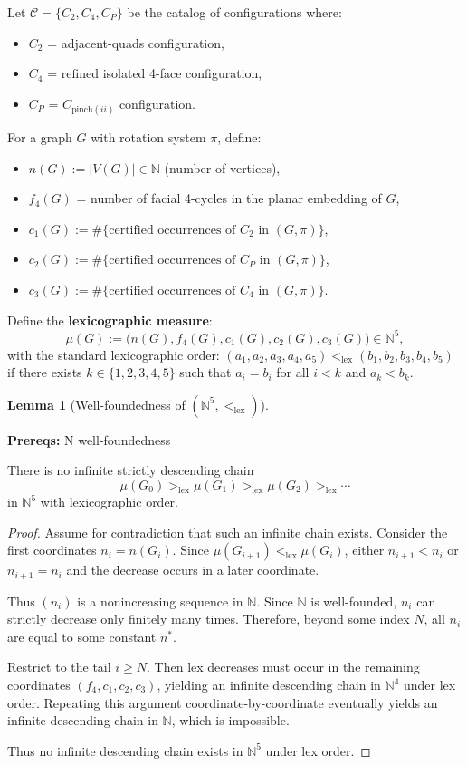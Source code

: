 \documentclass[12pt]{article}
\theoremstyle{definition}
\newtheorem{lemma}[theorem]{Lemma}
\newcommand{\prereq}[1]{\par\noindent\textbf{Prereqs:} #1\par}
\begin{document}
Let $\mathcal{C} = \{C_2, C_4, C_P\}$ be the catalog of configurations where:
\begin{itemize}
    \item $C_2$ = adjacent-quads configuration,
    \item $C_4$ = refined isolated 4-face configuration,
    \item $C_P$ = $C_{\text{pinch}(ii)}$ configuration.
\end{itemize}

For a graph $G$ with rotation system $\pi$, define:
\begin{itemize}
    \item $n(G) := |V(G)| \in \mathbb{N}$ (number of vertices),
    \item $f_4(G)$ = number of facial 4-cycles in the planar embedding of $G$,
    \item $c_1(G) := \#\{\text{certified occurrences of } C_2 \text{ in } (G,\pi)\}$,
    \item $c_2(G) := \#\{\text{certified occurrences of } C_P \text{ in } (G,\pi)\}$,
    \item $c_3(G) := \#\{\text{certified occurrences of } C_4 \text{ in } (G,\pi)\}$.
\end{itemize}

Define the \textbf{lexicographic measure}:
\[
\mu(G) := \big(n(G), f_4(G), c_1(G), c_2(G), c_3(G)\big) \in \mathbb{N}^5,
\]
with the standard lexicographic order: $(a_1,a_2,a_3,a_4,a_5) <_{\text{lex}} (b_1,b_2,b_3,b_4,b_5)$ if there exists $k \in \{1,2,3,4,5\}$ such that $a_i = b_i$ for all $i < k$ and $a_k < b_k$.

\begin{lemma}[Well-foundedness of $(\mathbb{N}^5, <_{\text{lex}})$]
\label{lemma:well-founded}
\prereq{N well-foundedness}
There is no infinite strictly descending chain
\[
\mu(G_0) >_{\text{lex}} \mu(G_1) >_{\text{lex}} \mu(G_2) >_{\text{lex}} \cdots
\]
in $\mathbb{N}^5$ with lexicographic order.
\end{lemma}

\begin{proof}
Assume for contradiction that such an infinite chain exists. Consider the first coordinates $n_i = n(G_i)$. Since $\mu(G_{i+1}) <_{\text{lex}} \mu(G_i)$, either $n_{i+1} < n_i$ or $n_{i+1} = n_i$ and the decrease occurs in a later coordinate.

Thus $(n_i)$ is a nonincreasing sequence in $\mathbb{N}$. Since $\mathbb{N}$ is well-founded, $n_i$ can strictly decrease only finitely many times. Therefore, beyond some index $N$, all $n_i$ are equal to some constant $n^*$.

Restrict to the tail $i \ge N$. Then lex decreases must occur in the remaining coordinates $(f_4, c_1, c_2, c_3)$, yielding an infinite descending chain in $\mathbb{N}^4$ under lex order. Repeating this argument coordinate-by-coordinate eventually yields an infinite descending chain in $\mathbb{N}$, which is impossible.

Thus no infinite descending chain exists in $\mathbb{N}^5$ under lex order.
\end{proof}
\end{document}
